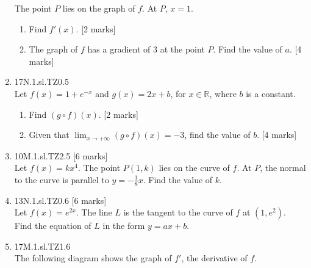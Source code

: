 \documentclass[12pt, twoside]{article}
\begin{document}
\begin{enumerate}
    The point $P$ lies on the graph of $f$. At $P$, $x=1$.
    \begin{enumerate}
      \item Find $f'(x)$. [2 marks]
      \item The graph of $f$ has a gradient of 3 at the point $P$. Find the value of $a$. [4 marks]
    \end{enumerate}

  \item 17N.1.sl.TZ0.5\\
  Let $f(x)=1+e^{-x}$ and $g(x)=2x+b$, for $x \in \mathbb{R}$, where $b$ is a constant.
  \begin{enumerate}
    \item Find $(g \circ f)(x)$. [2 marks]
    \item Given that $\displaystyle \lim_{x \rightarrow +\infty} (g \circ f)(x) = -3$, find the value of $b$. [4 marks]
  \end{enumerate}

  \item 10M.1.sl.TZ2.5 [6 marks]\\
  Let $f(x)=kx^4$. The point $P(1,k)$ lies on the curve of $f$. At $P$, the normal to the curve is parallel to $y=- \frac{1}{8} x$. Find the value of $k$.

  \item 13N.1.sl.TZ0.6 [6 marks]\\
  Let $f(x)=e^{2x}$. The line $L$ is the tangent to the curve of $f$ at $(1,e^2)$.\\
  Find the equation of $L$ in the form $y=ax+b$.

  \item 17M.1.sl.TZ1.6\\
  The following diagram shows the graph of $f'$, the derivative of $f$.
    \begin{center}
    \end{center}


\end{enumerate}
\end{document}
